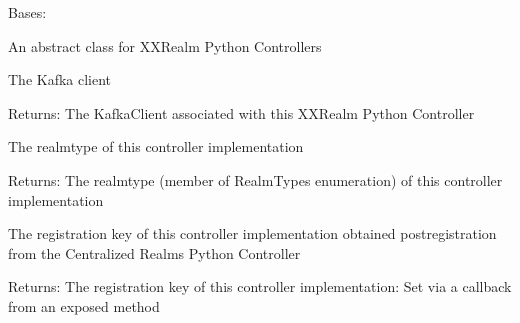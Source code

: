\documentclass[letterpaper,10pt,english]{sphinxmanual}
\begin{document}
\begin{fulllineitems}
\label{\detokenize{Forge:Forge.Controller}}
\sphinxAtStartPar
Bases: 

\sphinxAtStartPar
An abstract class for XXRealm Python Controllers

\begin{fulllineitems}
\label{\detokenize{Forge:Forge.Controller.kafka_client}}
\sphinxAtStartPar
The Kafka client

\sphinxAtStartPar
Returns: The KafkaClient associated with this XXRealm Python Controller

\end{fulllineitems}


\begin{fulllineitems}
\label{\detokenize{Forge:Forge.Controller.realm}}
\sphinxAtStartPar
The realm\sphinxhyphen{}type of this controller implementation

\sphinxAtStartPar
Returns: The realm\sphinxhyphen{}type (member of RealmTypes enumeration) of this controller implementation

\end{fulllineitems}


\begin{fulllineitems}
\label{\detokenize{Forge:Forge.Controller.registration_key}}
\sphinxAtStartPar
The registration key of this controller implementation obtained post\sphinxhyphen{}registration from the Centralized Realms
Python Controller

\sphinxAtStartPar
Returns: The registration key of this controller implementation: Set via a callback from an exposed method


\end{fulllineitems}
\end{fulllineitems}
\end{document}
